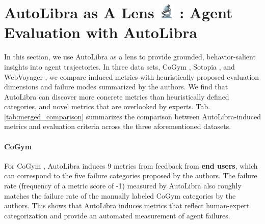 \documentclass[../main.tex]{subfiles}
\begin{document}
    \section{\texorpdfstring{AutoLibra as A Lens
    \includegraphics[height=1em]{figs/microscope.png}
    : Agent Evaluation with AutoLibra}{AutoLibra as a lens: agent evaluation with
    AutoLibra}}
    \label{sec:lens}

    In this section, we use AutoLibra as a lens to provide grounded, behavior-salient
    insights into agent trajectories. In three data sets, CoGym \citep{shao2024collaborative},
    Sotopia \citep{zhousotopia}, and WebVoyager \citep{he2024webvoyager}, we
    compare induced metrics with heuristically proposed evaluation dimensions
    and failure modes summarized by the authors. We find that AutoLibra can discover
    more concrete metrics than heuristically defined categories, and novel
    metrics that are overlooked by experts. Tab. \ref{tab:merged_comparison}
    summarizes the comparison between AutoLibra-induced metrics and evaluation
    criteria across the three aforementioned datasets.

    \paragraph{CoGym}
    For CoGym \citep{shao2024collaborative}, AutoLibra induces 9 metrics from feedback
    from \textbf{end users}, which can correspond to the five failure categories
    proposed by the authors. The failure rate (frequency of a metric score of -1)
    measured by AutoLibra also roughly matches the failure rate of the manually labeled
    CoGym categories by the authors. This shows that AutoLibra induces metrics
    that reflect human-expert categorization and provide an automated
    measurement of agent failures.
\end{document}

